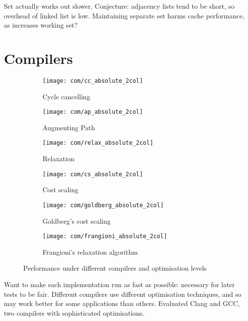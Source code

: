 Set actually works out slower. Conjecture: adjacency lists tend to be short, so overhead of linked list is low. Maintaining separate set harms cache performance, as increases working set?


\section{Compilers}

\begin{figure}
    \begin{widepage}
    \begin{subfigure}[c]{0.5\textwidth}
        \texttt{[image: com/cc\_absolute\_2col]}
        \caption{Cycle cancelling}
    \end{subfigure}
    \begin{subfigure}[c]{0.5\textwidth}
        \texttt{[image: com/ap\_absolute\_2col]}
        \caption{Augmenting Path}
    \end{subfigure}
    \begin{subfigure}[c]{0.5\textwidth}
        \texttt{[image: com/relax\_absolute\_2col]}
        \caption{Relaxation}
    \end{subfigure}
    \begin{subfigure}[c]{0.5\textwidth}
        \texttt{[image: com/cs\_absolute\_2col]}
        \caption{Cost scaling}
    \end{subfigure}
    \begin{subfigure}[c]{0.5\textwidth}
        \texttt{[image: com/goldberg\_absolute\_2col]}
        \caption{Goldberg's cost scaling}
    \end{subfigure}
    \begin{subfigure}[c]{0.5\textwidth}
        \texttt{[image: com/frangioni\_absolute\_2col]}
        \caption{Frangioni's relaxation algorithm}
    \end{subfigure}
    \end{widepage}
    \caption{Performance under different compilers and optimisation levels}
    \label{fig:compilers}
\end{figure}

Want to make each implementation run as fast as possible: necessary for later tests to be fair. Different compilers use different optimisation techniques, and so may work better for some applications than others. Evaluated Clang and GCC, two compilers with sophisticated optimisations.

